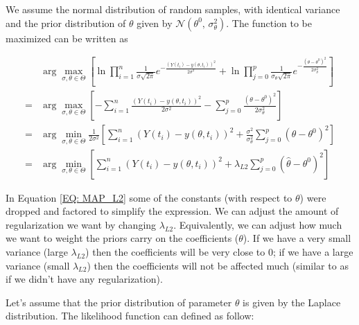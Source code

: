 \documentclass[a4paper,fleqn]{cas-dc}
\begin{document}
We assume the normal distribution of random samples, with identical variance and the prior distribution of $\theta$ given by $\mathcal{N}(\theta^0,\,\sigma_\theta^{2})$. The function to be maximized can be written as

{\footnotesize
\begin{equation} \label{EQ: MAP_L2}
	\begin{aligned}
	&\arg\max_{\sigma, \theta \in \Theta} \left[ \ln \prod_{i=1}^{n} \frac{1}{\sigma\sqrt{2\pi}}e^{-\frac{ \left( Y(t_i) - y\left( \theta, t_i \right) \right)^2 }{2\sigma^2}}
	+ \ln \prod_{j=0}^{p} \frac{1}{\sigma_\theta\sqrt{2\pi}}e^{-\frac{ \left( \theta - \theta^0 \right)^2}{2\sigma_\theta^2}} \right]  \\
	= &\arg\max_{\sigma, \theta \in \Theta} \left[- \sum_{i=1}^{n} {\frac{\left( Y(t_i) - y\left( \theta, t_i \right) \right)^2}{2\sigma^2}}
	- \sum_{j=0}^{p} {\frac{\left( \theta - \theta^0 \right)^2}{2\sigma_\theta^2}} \right]\\
	= &\arg\min_{\sigma, \theta \in \Theta} \frac{1}{2\sigma^2} \left[ \sum_{i=1}^{n} \left( Y(t_i) - y\left( \theta, t_i \right) \right)^2
	+ \frac{\sigma^2}{\sigma_\theta^2} \sum_{j=0}^{p} \left( \theta - \theta^0 \right)^2 \right] \\
	= &\arg\min_{\sigma, \theta \in \Theta} \left[ \sum_{i=1}^{n} \left( Y(t_i) - y\left( \theta, t_i \right) \right)^2 + \lambda_{L2} \sum_{j=0}^{p} \left( \hat{\theta} - \theta^0 \right)^2 \right]
	\end{aligned}
\end{equation} }

In Equation \ref{EQ: MAP_L2} some of the constants (with respect to $\theta$) were dropped and factored to simplify the expression. We can adjust the amount of regularization we want by changing $\lambda_{L2}$. Equivalently, we can adjust how much we want to weight the priors carry on the coefficients ($\theta$). If we have a very small variance (large $\lambda_{L2}$) then the coefficients will be very close to 0; if we have a large variance (small $\lambda_{L2}$) then the coefficients will not be affected much (similar to as if we didn't have any regularization).

Let's assume that the prior distribution of parameter $\theta$ is given by the Laplace distribution. The likelihood function can defined as follow:
\end{document}
